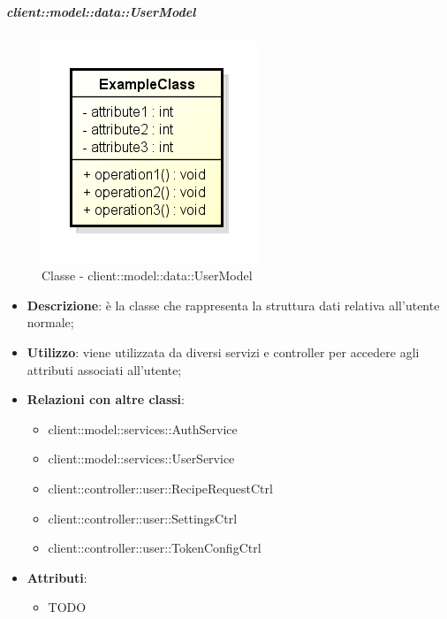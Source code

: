 		\subparagraph{client::model::data::UserModel} %
		\label{subp:client_model_data_user}
			\begin{figure}[htbp]
				\centering
				\centerline{\includegraphics[scale=0.7]{./images/client/classes/example_class.png}}
				\caption{Classe - client::model::data::UserModel}
			\end{figure}
			\begin{itemize}
				\item \textbf{Descrizione}: è la classe che rappresenta la struttura dati relativa all'utente normale;
				\item \textbf{Utilizzo}: viene utilizzata da diversi servizi e controller per accedere agli attributi associati all'utente;
				\item \textbf{Relazioni con altre classi}:
					\begin{itemize}
						\item client::model::services::AuthService
						\item client::model::services::UserService
						\item client::controller::user::RecipeRequestCtrl
						\item client::controller::user::SettingsCtrl
						\item client::controller::user::TokenConfigCtrl
					\end{itemize}
				\item \textbf{Attributi}:
					\begin{itemize}
						\item TODO
					\end{itemize}

			\end{itemize}

